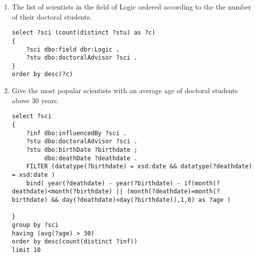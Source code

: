 \documentclass[a4paper, 12pt]{report}
\begin{document}
\begin{enumerate}
\item The list of scientists in the field of Logic ordered according to the the number of their doctoral students.
\begin{lstlisting}[frame=single]
select ?sci (count(distinct ?stu) as ?c)
{
    ?sci dbo:field dbr:Logic .
    ?stu dbo:doctoralAdvisor ?sci .
}
order by desc(?c) 
\end{lstlisting}

\item Give the most popular scientists with an average age of doctoral students above 30 years.
\begin{lstlisting}[frame=single]
select ?sci 
{
    ?inf dbo:influencedBy ?sci .
    ?stu dbo:doctoralAdvisor ?sci .
    ?stu dbo:birthDate ?birthdate ;
         dbo:deathDate ?deathdate .
    FILTER (datatype(?birthdate) = xsd:date && datatype(?deathdate) = xsd:date )
    bind( year(?deathdate) - year(?birthdate) - if(month(?deathdate)<month(?birthdate) || (month(?deathdate)=month(?birthdate) && day(?deathdate)<day(?birthdate)),1,0) as ?age )

}
group by ?sci
having (avg(?age) > 30)
order by desc(count(distinct ?inf))
limit 10
\end{lstlisting}
\end{enumerate}
\end{document}
